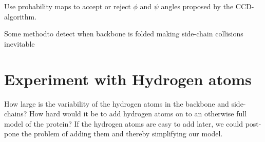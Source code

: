 Use probability maps to accept or reject $\phi$ and $\psi$ angles proposed by the CCD-algorithm.

Some method\texttrademark to detect when backbone is folded making side-chain collisions inevitable

\section{Experiment with Hydrogen atoms}
How large is the variability of the hydrogen atoms in the backbone and
side-chains? How hard would it be to add hydrogen atoms on to an
otherwise full model of the protein? If the hydrogen atoms are easy to
add later, we could post-pone the problem of adding them and thereby
simplifying our model.

